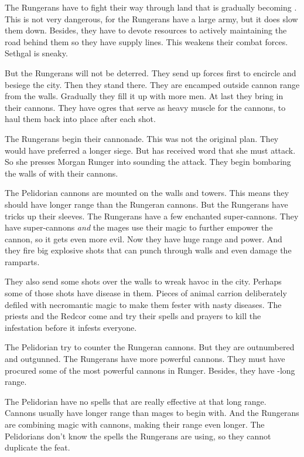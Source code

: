 The Rungerans have to fight their way through land that is gradually becoming \wylde. 
This is not very dangerous, for the Rungerans have a large army, but it does slow them down.
Besides, they have to devote resources to actively maintaining the road behind them so they have supply lines. 
This weakens their combat forces. 
Sethgal is sneaky. 

But the Rungerans will not be deterred. 
They send up forces first to encircle and besiege the city.
Then they stand there. 
They are encamped outside cannon range from the walls. 
Gradually they fill it up with more men. 
At last they bring in their cannons. 
They have ogres that serve as heavy muscle for the cannons, to haul them back into place after each shot. 

The Rungerans begin their cannonade.
This was not the original plan.
They would have preferred a longer siege.
But \Takestsha has received word that she must attack. 
So she presses Morgan Runger into sounding the attack.
They begin bombaring the walls of \Forclin with their cannons. 

The Pelidorian cannons are mounted on the walls and towers. 
This means they should have longer range than the Rungeran cannons.
But the Rungerans have tricks up their sleeves.
The Rungerans have a few enchanted super-cannons. 
They have super-cannons \emph{and} the mages use their magic to further empower the cannon, so it gets even more evil.
Now they have huge range and power. 
And they fire big explosive shots that can punch through walls and even damage the ramparts. 

They also send some shots over the walls to wreak havoc in the city. 
Perhaps some of those shots have disease in them. 
Pieces of animal carrion deliberately defiled with necromantic magic to make them fester with nasty diseases. 
The priests and the Redcor come and try their spells and prayers to kill the infestation before it infests everyone. 

The Pelidorian \ishrah try to counter the Rungeran cannons.
But they are outnumbered and outgunned. 
The Rungerans have more powerful cannons. 
They must have procured some of the most powerful cannons in Runger. 
Besides, they have \uber-long range. 

The Pelidorian \ishrah have no spells that are really effective at that long range. 
Cannons usually have longer range than mages to begin with. 
And the Rungerans are combining magic with cannons, making their range even longer. 
The Pelidorians don't know the spells the Rungerans are using, so they cannot duplicate the feat. 

